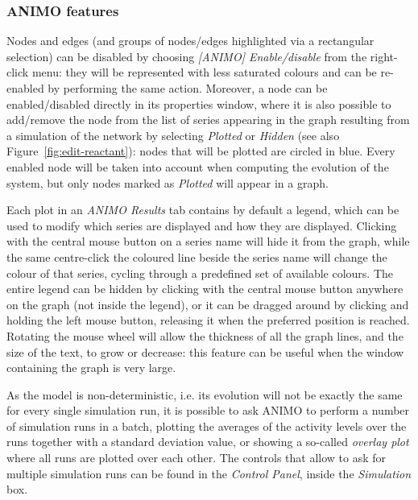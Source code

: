 \subsubsection{ANIMO features}
Nodes and edges (and groups of nodes/edges highlighted via a rectangular selection)
can be disabled by choosing \emph{[ANIMO] Enable/disable} from
the right-click menu: they will be represented with less saturated colours and can be re-enabled by performing
the same action. Moreover, a node can be enabled/disabled directly in its properties window, where it is
also possible to add/remove the node from the list of series appearing in the graph resulting from a simulation
of the network by selecting \emph{Plotted} or \emph{Hidden} (see also Figure~\ref{fig:edit-reactant}):
nodes that will be plotted are circled in blue.
Every enabled node will be taken into account when computing the evolution of the system,
but only nodes marked as \emph{Plotted} will appear in a graph.

Each plot in an \emph{ANIMO Results} tab contains by default a legend, which can be used to modify which series are
displayed and how they are displayed. Clicking with the central mouse button on a series name will hide it from the
graph, while the same centre-click the coloured line beside the series name will change the colour of that series,
cycling through a predefined set of available colours. The entire legend can be hidden by clicking with the
central mouse button anywhere on the graph (not inside the legend), or it can be dragged around by clicking and holding the left
mouse button, releasing it when the preferred position is reached. Rotating the mouse wheel will allow the thickness of all
the graph lines, and the size of the text, to grow or decrease: this feature can be useful when the window containing
the graph is very large.

As the model is non-deterministic, i.e. its
evolution will not be exactly the same for every single simulation run, it is possible to ask ANIMO to perform
a number of simulation runs in a batch, plotting the averages of the activity levels over the runs together with a standard
deviation value, or showing a so-called \emph{overlay plot} where all runs are plotted over each other. The controls
that allow to ask for multiple simulation runs can be found in the \emph{Control Panel}, inside the \emph{Simulation} box.

